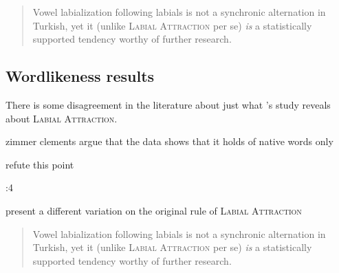 \begin{quote}
Vowel labialization following labials is not a synchronic alternation in Turkish, yet it (unlike \textsc{Labial Attraction} per se) \emph{is} a statistically supported tendency worthy of further research. \citep[][196, emphasis in original]{Inkelas2001} 
\end{quote}



\subsection{Wordlikeness results}

There is some disagreement in the literature about just what \citeauthor{Zimmer1969}'s study reveals about \textsc{Labial Attraction}.

zimmer
clements
\citet{Ito1993} 
argue that the data shows that it holds of native words only


\citet{Inkelas2001} refute this point


\citet{Zuraw2000}:4

\citet{Inkelas2001} present a different variation on the original rule of \textsc{Labial Attraction}


\begin{quote}
Vowel labialization following labials is not a synchronic alternation in Turkish, yet it (unlike \textsc{Labial Attraction} per se) \emph{is} a statistically supported tendency worthy of further research. \citep[][196, emphasis in original]{Inkelas2001}
\end{quote}

